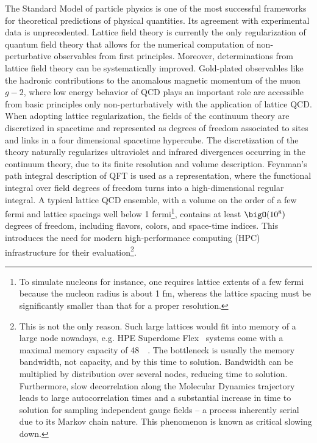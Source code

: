 The Standard Model of particle physics is one of the most successful frameworks for theoretical predictions of physical quantities.
Its agreement with experimental data is unprecedented.
Lattice field theory is currently the only regularization of quantum field theory that allows for the numerical computation of non-perturbative observables from first principles.
Moreover, determinations from lattice field theory can be systematically improved.
Gold-plated observables like the hadronic contributions to the anomalous magnetic momentum of the muon $g-2$, where low energy behavior of QCD plays an important role are accessible from basic principles only non-perturbatively with the application of lattice QCD.
When adopting lattice regularization, the fields of the continuum theory are discretized in spacetime and represented as degrees of freedom associated to sites and links in a four dimensional spacetime hypercube.
The discretization of the theory naturally regularizes ultraviolet and infrared divergences occurring in the continuum theory, due to its finite resolution and volume description.
Feynman's path integral description of QFT is used as a representation, where the functional integral over field degrees of freedom turns into a high-dimensional regular integral.
A typical lattice QCD ensemble, with a volume on the order of a few fermi and lattice spacings well below \num{1} fermi\footnote{To simulate nucleons for instance, one requires lattice extents of a few fermi because the nucleon radius is about \num{1} fm, whereas the lattice spacing must be significantly smaller than that for a proper resolution.}, contains at least $\bigO(10^8)$ degrees of freedom, including flavors, colors, and space-time indices.
This introduces the need for modern high-performance computing (HPC) infrastructure for their evaluation\footnote{
This is not the only reason.
Such large lattices would fit into memory of a large node nowadays, e.g. HPE Superdome Flex~\cite{online:superdome} systems come with a maximal memory capacity of \SI{48}{\tera \byte}.
The bottleneck is usually the memory bandwidth, not capacity, and by this time to solution.
Bandwidth can be multiplied by distribution over several nodes, reducing time to solution.
Furthermore, slow decorrelation along the Molecular Dynamics trajectory leads to large autocorrelation times and a substantial increase in time to solution for sampling independent gauge fields -- a process inherently serial due to its Markov chain nature.
This phenomenon is known as critical slowing down.
}.
